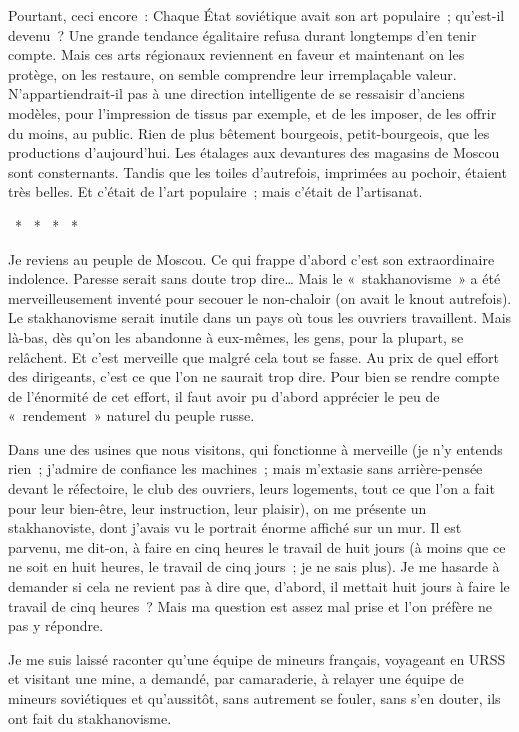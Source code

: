 \documentclass[french,twoside]{book} %
\begin{document}
Pourtant, ceci encore : Chaque État soviétique avait son art populaire ; qu’est-il devenu ? Une grande tendance égalitaire refusa durant longtemps d’en tenir compte. Mais ces arts régionaux reviennent en faveur et maintenant on les protège, on les restaure, on semble comprendre leur irremplaçable valeur. N’appartiendrait-il pas à une direction intelligente de se ressaisir d’anciens modèles, pour l’impression de tissus par exemple, et de les imposer, de les offrir du moins, au public. Rien de plus bêtement bourgeois, petit-bourgeois, que les productions d’aujourd’hui. Les étalages aux devantures des magasins de Moscou sont consternants. Tandis que les toiles d’autrefois, imprimées au pochoir, étaient très belles. Et c’était de l’art populaire ; mais c’était de l’artisanat.\par
{\centering \noindent *  *  *  *  *\par}
\noindent Je reviens au peuple de Moscou. Ce qui frappe d’abord c’est son extraordinaire indolence. Paresse serait sans doute trop dire… Mais le « stakhanovisme » a été merveilleusement inventé pour secouer le non-chaloir (on avait le knout autrefois). Le stakhanovisme serait inutile dans un pays où tous les ouvriers travaillent. Mais là-bas, dès qu’on les abandonne à eux-mêmes, les gens, pour la plupart, se relâchent. Et c’est merveille que malgré cela tout se fasse. Au prix de quel effort des dirigeants, c’est ce que l’on ne saurait trop dire. Pour bien se rendre compte de l’énormité de cet effort, il faut avoir pu d’abord apprécier le peu de « rendement » naturel du peuple russe.\par
Dans une des usines que nous visitons, qui fonctionne à merveille (je n’y entends rien ; j’admire de confiance les machines ; mais m’extasie sans arrière-pensée devant le réfectoire, le club des ouvriers, leurs logements, tout ce que l’on a fait pour leur bien-être, leur instruction, leur plaisir), on me présente un stakhanoviste, dont j’avais vu le portrait énorme affiché sur un mur. Il est parvenu, me dit-on, à faire en cinq heures le travail de huit jours (à moins que ce ne soit en huit heures, le travail de cinq jours ; je ne sais plus). Je me hasarde à demander si cela ne revient pas à dire que, d’abord, il mettait huit jours à faire le travail de cinq heures ? Mais ma question est assez mal prise et l’on préfère ne pas y répondre.\par
Je me suis laissé raconter qu’une équipe de mineurs français, voyageant en URSS et visitant une mine, a demandé, par camaraderie, à relayer une équipe de mineurs soviétiques et qu’aussitôt, sans autrement se fouler, sans s’en douter, ils ont fait du stakhanovisme.\par
\end{document}
